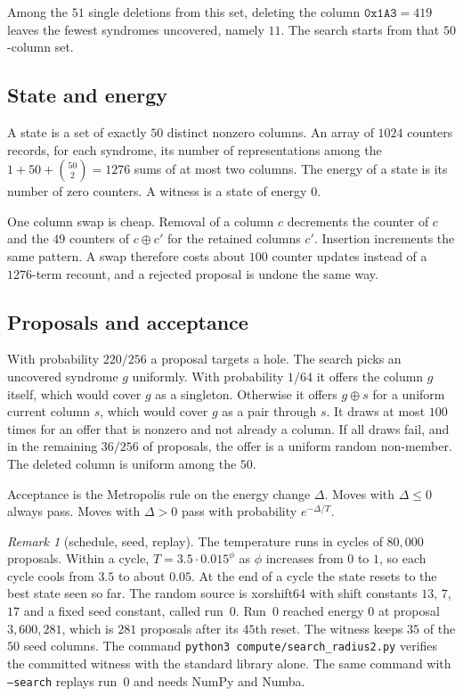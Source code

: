 \documentclass[11pt,a4paper]{article}
\theoremstyle{remark}
\newtheorem{remark}{Remark}
\begin{document}
Among the $51$ single deletions from this set, deleting the column
$\mathtt{0x1A3}=419$ leaves the fewest syndromes uncovered, namely
$11$. The search starts from that $50$-column set.

\subsection{State and energy}

A state is a set of exactly $50$ distinct nonzero columns. An array of
$1024$ counters records, for each syndrome, its number of
representations among the $1+50+\binom{50}{2}=1276$ sums of at most two
columns. The energy of a state is its number of zero counters. A
witness is a state of energy $0$.

One column swap is cheap. Removal of a column $c$ decrements the
counter of $c$ and the $49$ counters of $c\oplus c'$ for the retained
columns $c'$. Insertion increments the same pattern. A swap therefore
costs about $100$ counter updates instead of a $1276$-term recount, and
a rejected proposal is undone the same way.

\subsection{Proposals and acceptance}

With probability $220/256$ a proposal targets a hole. The search picks
an uncovered syndrome $g$ uniformly. With probability $1/64$ it offers
the column $g$ itself, which would cover $g$ as a singleton. Otherwise
it offers $g\oplus s$ for a uniform current column $s$, which would
cover $g$ as a pair through $s$. It draws at most $100$ times for an
offer that is nonzero and not already a column. If all draws fail, and
in the remaining $36/256$ of proposals, the offer is a uniform random
non-member. The deleted column is uniform among the $50$.

Acceptance is the Metropolis rule on the energy change $\Delta$. Moves
with $\Delta\le 0$ always pass. Moves with $\Delta>0$ pass with
probability $e^{-\Delta/T}$.

\begin{remark}[schedule, seed, replay]
\label{rem:schedule}
The temperature runs in cycles of $80{,}000$ proposals. Within a cycle,
$T=3.5\cdot 0.015^{\phi}$ as $\phi$ increases from $0$ to $1$, so each
cycle cools from $3.5$ to about $0.05$. At the end of a cycle the state
resets to the best state seen so far. The random source is xorshift64
with shift constants $13$, $7$, $17$ and a fixed seed constant, called
run~$0$. Run~$0$ reached energy $0$ at proposal $3{,}600{,}281$, which
is $281$ proposals after its $45$th reset. The witness keeps $35$ of
the $50$ seed columns. The command
\texttt{python3 compute/search\_radius2.py} verifies the committed
witness with the standard library alone. The same command with
\texttt{--search} replays run~$0$ and needs NumPy and Numba.
\end{remark}
\end{document}
